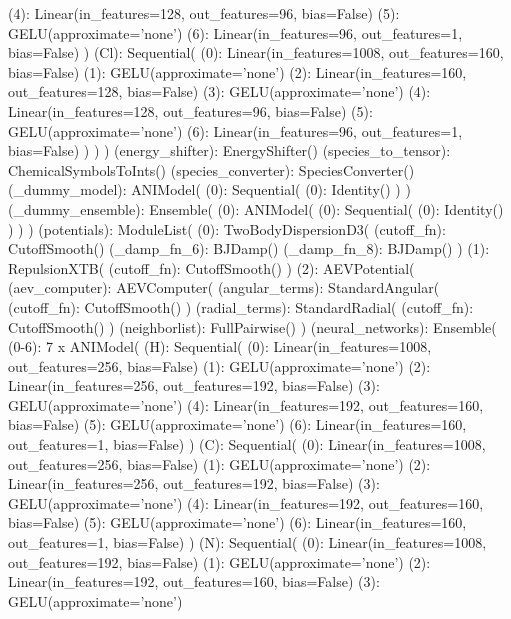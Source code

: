         (4): Linear(in_features=128, out_features=96, bias=False)
        (5): GELU(approximate='none')
        (6): Linear(in_features=96, out_features=1, bias=False)
      )
      (Cl): Sequential(
        (0): Linear(in_features=1008, out_features=160, bias=False)
        (1): GELU(approximate='none')
        (2): Linear(in_features=160, out_features=128, bias=False)
        (3): GELU(approximate='none')
        (4): Linear(in_features=128, out_features=96, bias=False)
        (5): GELU(approximate='none')
        (6): Linear(in_features=96, out_features=1, bias=False)
      )
    )
  )
  (energy_shifter): EnergyShifter()
  (species_to_tensor): ChemicalSymbolsToInts()
  (species_converter): SpeciesConverter()
  (_dummy_model): ANIModel(
    (0): Sequential(
      (0): Identity()
    )
  )
  (_dummy_ensemble): Ensemble(
    (0): ANIModel(
      (0): Sequential(
        (0): Identity()
      )
    )
  )
  (potentials): ModuleList(
    (0): TwoBodyDispersionD3(
      (cutoff_fn): CutoffSmooth()
      (_damp_fn_6): BJDamp()
      (_damp_fn_8): BJDamp()
    )
    (1): RepulsionXTB(
      (cutoff_fn): CutoffSmooth()
    )
    (2): AEVPotential(
      (aev_computer): AEVComputer(
        (angular_terms): StandardAngular(
          (cutoff_fn): CutoffSmooth()
        )
        (radial_terms): StandardRadial(
          (cutoff_fn): CutoffSmooth()
        )
        (neighborlist): FullPairwise()
      )
      (neural_networks): Ensemble(
        (0-6): 7 x ANIModel(
          (H): Sequential(
            (0): Linear(in_features=1008, out_features=256, bias=False)
            (1): GELU(approximate='none')
            (2): Linear(in_features=256, out_features=192, bias=False)
            (3): GELU(approximate='none')
            (4): Linear(in_features=192, out_features=160, bias=False)
            (5): GELU(approximate='none')
            (6): Linear(in_features=160, out_features=1, bias=False)
          )
          (C): Sequential(
            (0): Linear(in_features=1008, out_features=256, bias=False)
            (1): GELU(approximate='none')
            (2): Linear(in_features=256, out_features=192, bias=False)
            (3): GELU(approximate='none')
            (4): Linear(in_features=192, out_features=160, bias=False)
            (5): GELU(approximate='none')
            (6): Linear(in_features=160, out_features=1, bias=False)
          )
          (N): Sequential(
            (0): Linear(in_features=1008, out_features=192, bias=False)
            (1): GELU(approximate='none')
            (2): Linear(in_features=192, out_features=160, bias=False)
            (3): GELU(approximate='none')
